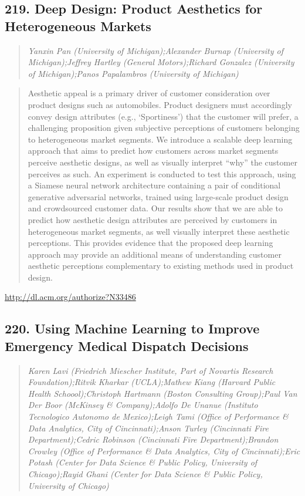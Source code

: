 \documentclass{article}
\begin{document}
\subsection{219. Deep Design: Product Aesthetics for Heterogeneous Markets}

\begin{quote}
\footnotesize{\textit{Yanxin Pan (University of Michigan);Alexander Burnap (University of Michigan);Jeffrey Hartley (General Motors);Richard Gonzalez (University of Michigan);Panos Papalambros (University of Michigan)}}

\end{quote}

\begin{quote}
Aesthetic appeal is a primary driver of customer consideration over product designs such as automobiles. Product designers must accordingly convey design attributes (e.g., `Sportiness’) that the customer will prefer, a challenging proposition given subjective perceptions of customers belonging to heterogeneous market segments. We introduce a scalable deep learning approach that aims to predict how customers across market segments perceive aesthetic designs, as well as visually interpret ``why” the customer perceives as such. An experiment is conducted to test this approach, using a Siamese neural network architecture containing a pair of conditional generative adversarial networks, trained using large-scale product design and crowdsourced customer data. Our results show that we are able to predict how aesthetic design attributes are perceived by customers in heterogeneous market segments, as well visually interpret these aesthetic perceptions. This provides evidence that the proposed deep learning approach may provide an additional means of understanding customer aesthetic perceptions complementary to existing methods used in product design.
\end{quote}

\href{http://dl.acm.org/authorize?N33486}{http://dl.acm.org/authorize?N33486}

\subsection{220. Using Machine Learning to Improve Emergency Medical Dispatch Decisions}

\begin{quote}
\footnotesize{\textit{Karen Lavi (Friedrich Miescher Institute, Part of Novartis Research Foundation);Ritvik Kharkar (UCLA);Mathew Kiang (Harvard Public Health Schoool);Christoph Hartmann (Boston Consulting Group);Paul Van Der Boor (McKinsey \& Company);Adolfo De Unanue (Instituto Tecnologico Autonomo de Mexico);Leigh Tami (Office of Performance \& Data Analytics, City of Cincinnati);Anson Turley (Cincinnati Fire Department);Cedric Robinson (Cincinnati Fire Department);Brandon Crowley (Office of Performance \& Data Analytics, City of Cincinnati);Eric Potash (Center for Data Science \& Public Policy, University of Chicago);Rayid Ghani (Center for Data Science \& Public Policy, University of Chicago)}}

\end{quote}
\end{document}
